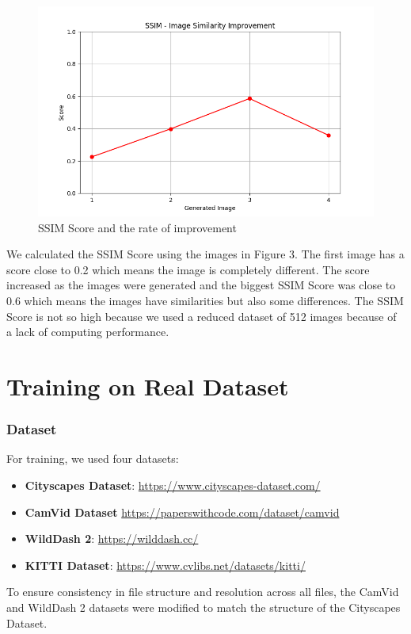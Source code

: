 \documentclass[12pt,a4paper]{report}
\begin{document}
\begin{figure}
    \centering
    \includegraphics[width=0.75\linewidth]{similarity_improvement.png}
    \caption{SSIM Score and the rate of improvement}
    \label{fig:enter-label}
\end{figure}

We calculated the SSIM Score using the images in Figure 3. The first image has a score close to 0.2 which means the image is completely different. The score increased as the images were generated and the biggest SSIM Score was close to 0.6 which means the images have similarities but also some differences. The SSIM Score is not so high because we used a reduced dataset of 512 images because of a lack of computing performance.

\chapter*{Training on Real Dataset}

\subsection*{Dataset}

For training, we used four datasets:
\begin{itemize}
    \item \textbf{Cityscapes Dataset}: \url{https://www.cityscapes-dataset.com/}
    \item \textbf{CamVid Dataset} \url{https://paperswithcode.com/dataset/camvid}
    \item \textbf{WildDash 2}: \url{https://wilddash.cc/}
    \item \textbf{KITTI Dataset}: \url{https://www.cvlibs.net/datasets/kitti/}
\end{itemize}

To ensure consistency in file structure and resolution across all files, the CamVid and WildDash 2 datasets were modified to match the structure of the Cityscapes Dataset.
\end{document}
